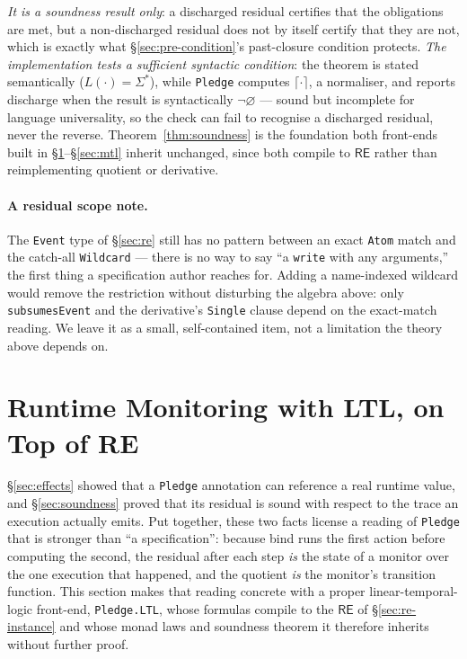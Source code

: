 \documentclass[acmsmall,screen]{acmart}
\newcommand{\RE}{\mathsf{RE}}
\newcommand{\norm}[1]{\lceil #1 \rceil}
\newcommand{\univ}{\neg\varnothing}
\begin{document}
\emph{It is a soundness result only}: a discharged residual certifies that
the obligations are met, but a non-discharged residual does not by itself
certify that they are not, which is exactly what
\S\ref{sec:pre-condition}'s past-closure condition protects.
\emph{The implementation tests a sufficient syntactic condition}: the
theorem is stated semantically ($L(\cdot) = \Sigma^*$), while
\lstinline{Pledge} computes $\norm{\cdot}$, a normaliser, and reports
discharge when the result is syntactically $\univ$ --- sound but incomplete
for language universality, so the check can fail to recognise a discharged
residual, never the reverse.
Theorem~\ref{thm:soundness} is the foundation both front-ends built in
\S\ref{sec:ltl}--\S\ref{sec:mtl} inherit unchanged, since both compile to
$\RE$ rather than reimplementing quotient or derivative.

\paragraph{A residual scope note.}
The \lstinline{Event} type of \S\ref{sec:re} still has no pattern between
an exact \lstinline{Atom} match and the catch-all \lstinline{Wildcard} ---
there is no way to say ``a \lstinline{write} with any arguments,'' the
first thing a specification author reaches for.
Adding a name-indexed wildcard would remove the restriction without
disturbing the algebra above: only \lstinline{subsumesEvent} and the
derivative's \lstinline{Single} clause depend on the exact-match reading.
We leave it as a small, self-contained item, not a limitation the theory
above depends on.

\section{Runtime Monitoring with LTL, on Top of RE}
\label{sec:ltl}

\S\ref{sec:effects} showed that a \lstinline{Pledge} annotation can
reference a real runtime value, and \S\ref{sec:soundness} proved that its
residual is sound with respect to the trace an execution actually emits.
Put together, these two facts license a reading of \lstinline{Pledge} that
is stronger than ``a specification'': because bind runs the first action
before computing the second, the residual after each step \emph{is} the
state of a monitor over the one execution that happened, and the quotient
\emph{is} the monitor's transition function.
This section makes that reading concrete with a proper linear-temporal-logic
front-end, \lstinline{Pledge.LTL}, whose formulas compile to the $\RE$ of
\S\ref{sec:re-instance} and whose monad laws and soundness theorem it
therefore inherits without further proof.
\end{document}
